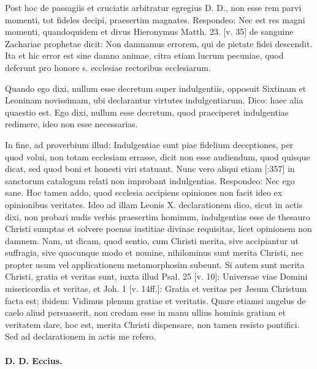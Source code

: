 Post hoc de passagiis et cruciatis arbitratur egregius D. D., non esse rem parvi momenti, tot fideles decipi, praesertim magnates. Respondeo: Nec est res magni momenti, quandoquidem et divus Hieronymus Matth. 23. [v. 35] de sanguine Zachariae prophetae dicit: Non damnamus errorem, qui de pietate fidei descendit. Ita et hic error est sine damno animae, citra etiam lucrum pecuniae, quod deferunt pro honore s. ecclesiae rectoribus ecclesiarum.

Quando ego dixi, nullum esse decretum super indulgentiis, opposuit Sixtinam et Leoninam novissimam, ubi declarantur virtutes indulgentiarum. Dico: haec alia quaestio est. Ego dixi, nullum esse decretum, quod praeciperet indulgentias redimere, ideo non esse necessarias.

In fine, ad proverbium illud: Indulgentiae sunt piae fidelium deceptiones, per quod volui, non totam ecclesiam errasse, dicit non esse audiendum, quod quisque dicat, sed quod boni et honesti viri statuant. Nunc vero aliqui etiam [:357] in sanctorum catalogum relati non improbant indulgentias. Respondeo: Nec ego sane. Hoc tamen addo, quod ecclesia accipiens opiniones non facit ideo ex opinionibus veritates. Ideo ad illam Leonis X. declarationem dico, sicut in actis dixi, non probari nudis verbis praesertim hominum, indulgentias esse de thesauro Christi sumptas et solvere poenas iustitiae divinae requisitas, licet opinionem non damnem. Nam, ut dicam, quod sentio, cum Christi merita, sive accipiantur ut suffragia, sive quocunque modo et nomine, nihilominus sunt merita Christi, nec propter usum vel applicationem metamorphosim subeunt. Si autem sunt merita Christi, gratia et veritas sunt, iuxta illud Psal. 25 [v. 10]: Universae viae Domini misericordia et veritas, et Joh. 1 [v. 14ff.]: Gratia et veritas per Jesum Christum facta est; ibidem: Vidimus plenum gratiae et veritatis. Quare etiamsi angelus de caelo aliud persuaserit, non credam esse in manu ullius hominis gratiam et veritatem dare, hoc est, merita Christi dispensare, non tamen resisto pontifici. Sed ad declarationem in actis me refero.

\paragraph*{D. D. Eccius.}

